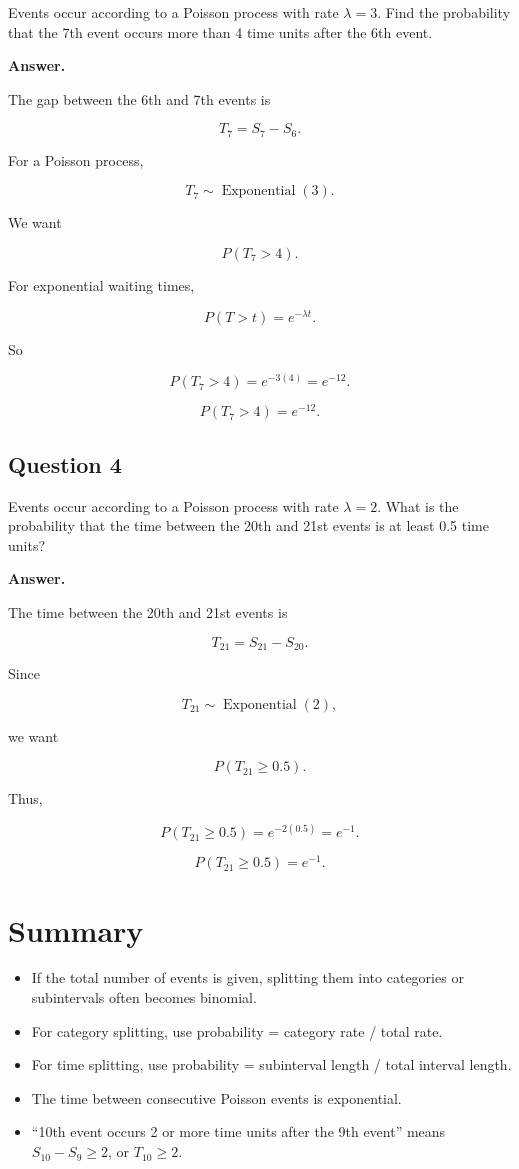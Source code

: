 \documentclass[12pt]{article}
\begin{document}
Events occur according to a Poisson process with rate \(\lambda=3\). Find the probability that the 7th event occurs more than 4 time units after the 6th event.

\textbf{Answer.}

The gap between the 6th and 7th events is

\[
T_7=S_7-S_6.
\]

For a Poisson process,

\[
T_7\sim \operatorname{Exponential}(3).
\]

We want

\[
P(T_7>4).
\]

For exponential waiting times,

\[
P(T>t)=e^{-\lambda t}.
\]

So

\[
P(T_7>4)=e^{-3(4)}=e^{-12}.
\]

\[
\boxed{P(T_7>4)=e^{-12}.}
\]

\subsection*{Question 4}

Events occur according to a Poisson process with rate \(\lambda=2\). What is the probability that the time between the 20th and 21st events is at least 0.5 time units?

\textbf{Answer.}

The time between the 20th and 21st events is

\[
T_{21}=S_{21}-S_{20}.
\]

Since

\[
T_{21}\sim \operatorname{Exponential}(2),
\]

we want

\[
P(T_{21}\geq 0.5).
\]

Thus,

\[
P(T_{21}\geq 0.5)=e^{-2(0.5)}=e^{-1}.
\]

\[
\boxed{P(T_{21}\geq 0.5)=e^{-1}.}
\]

\section{Summary}

\begin{itemize}
    \item If the total number of events is given, splitting them into categories or subintervals often becomes binomial.
    \item For category splitting, use probability = category rate / total rate.
    \item For time splitting, use probability = subinterval length / total interval length.
    \item The time between consecutive Poisson events is exponential.
    \item ``10th event occurs 2 or more time units after the 9th event'' means \(S_{10}-S_9\geq 2\), or \(T_{10}\geq 2\).
\end{itemize}
\end{document}

